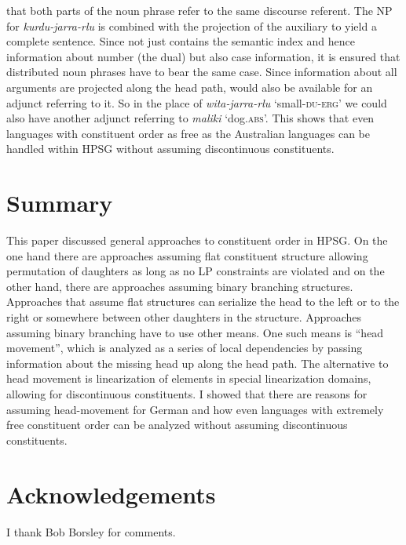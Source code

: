 \documentclass[output=paper]{langsci/langscibook}
\begin{document}
that both parts of the noun phrase refer to the same discourse referent. The NP for
\emph{kurdu-jarra-rlu} is combined with the projection of the auxiliary to yield a complete
sentence. Since  not just contains the semantic index and hence information about number
(the dual) but also case information, it is ensured that distributed noun phrases have to bear the
same case. Since information about all arguments are projected along the head path,  would
also be available for an adjunct referring to it. So in the place of \emph{wita-jarra-rlu}
`small-\textsc{du}-\textsc{erg}' we could also have another adjunct referring to \emph{maliki}
`dog.\textsc{abs}'. This shows that even languages with constituent order as free as the Australian
languages can be handled within HPSG without assuming discontinuous constituents.

\section{Summary}

This paper discussed general approaches to constituent order in HPSG. On the one hand there are
approaches assuming flat constituent structure allowing permutation of daughters as long as no LP
constraints are violated and on the other hand, there are approaches assuming binary branching
structures. Approaches that assume flat structures can serialize the head to the left or to the
right or somewhere between other daughters in the structure. Approaches assuming binary branching
have to use other means. One such means is ``head movement'', which is analyzed as a series of
local dependencies by passing information about the missing head up along the head path. The
alternative to head movement is linearization of elements in special linearization domains, allowing
for discontinuous constituents. I showed that there are reasons for assuming head-movement for
German and how even languages with extremely free constituent order can be analyzed without assuming
discontinuous constituents. 

\section*{Acknowledgements}

I thank Bob Borsley for comments.

{\sloppy
\printbibliography[heading=subbibliography,notkeyword=this] 
}
\end{document}
